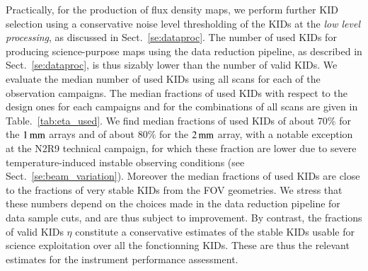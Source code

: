 Practically, for the production of flux density maps, we perform
further KID selection using a conservative noise level thresholding of
the KIDs at the \emph{low level processing}, as discussed in
Sect.~\ref{se:dataproc}. The number of used KIDs for producing
science-purpose maps using the data reduction pipeline, as described
in Sect.~\ref{se:dataproc}, is thus sizably lower than the number of
valid KIDs. We evaluate the median number of used KIDs using all scans
for each of the observation campaigns. The median fractions of used
KIDs with respect to the design ones for each campaigns and for the
combinations of all scans are given in Table.~\ref{tab:eta_used}. We
find median fractions of used KIDs of about $70\%$ for the
$1\, \rm{mm}$ arrays and of about $80\%$ for the $2\, \rm{mm}$ array,
with a notable exception at the N2R9 technical campaign, for which
these fraction are lower due to severe temperature-induced instable
observing conditions (see Sect.~\ref{se:beam_variation}). Moreover the
median fractions of used KIDs are close to the fractions of
very stable KIDs from the FOV geometries. We stress that these numbers
depend on the choices made in the data reduction pipeline for data
sample cuts, and are thus subject to improvement. By contrast, the
fractions of valid KIDs $\eta$ constitute a conservative estimates of the
stable KIDs usable for science exploitation over all the fonctionning
KIDs. These are thus the relevant estimates for the instrument
performance assessment.  
 
